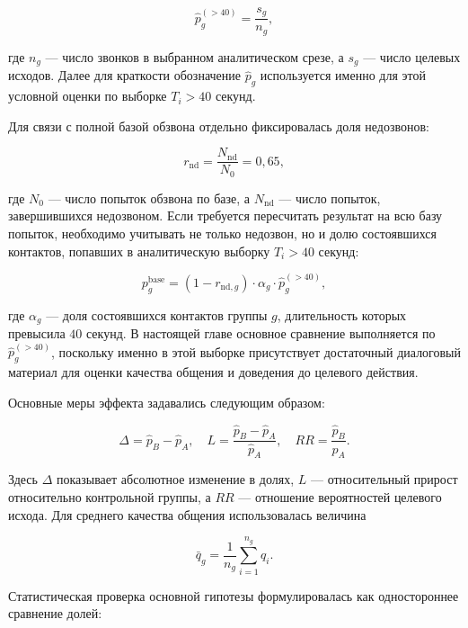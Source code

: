 \documentclass[a4paper,14pt]{extarticle}
\begin{document}
\begin{equation}
\hat p_g^{(>40)} = \frac{s_g}{n_g},
\end{equation}

где \(n_g\) --- число звонков в выбранном аналитическом срезе, а \(s_g\)
--- число целевых исходов. Далее для краткости обозначение \(\hat p_g\)
используется именно для этой условной оценки по выборке \(T_i > 40\)
секунд.

Для связи с полной базой обзвона отдельно фиксировалась доля недозвонов:

\begin{equation}
r_{\mathrm{nd}} = \frac{N_{\mathrm{nd}}}{N_0} = 0{,}65,
\end{equation}

где \(N_0\) --- число попыток обзвона по базе, а \(N_{\mathrm{nd}}\) ---
число попыток, завершившихся недозвоном. Если требуется пересчитать
результат на всю базу попыток, необходимо учитывать не только недозвон,
но и долю состоявшихся контактов, попавших в аналитическую выборку
\(T_i > 40\) секунд:

\begin{equation}
p_g^{\mathrm{base}} =
(1-r_{\mathrm{nd},g}) \cdot \alpha_g \cdot \hat p_g^{(>40)},
\end{equation}

где \(\alpha_g\) --- доля состоявшихся контактов группы \(g\),
длительность которых превысила \(40\) секунд. В настоящей главе основное
сравнение выполняется по \(\hat p_g^{(>40)}\), поскольку именно в этой
выборке присутствует достаточный диалоговый материал для оценки качества
общения и доведения до целевого действия.

Основные меры эффекта задавались следующим образом:

\begin{equation}
\Delta = \hat p_B - \hat p_A,
\quad
L = \frac{\hat p_B - \hat p_A}{\hat p_A},
\quad
RR = \frac{\hat p_B}{\hat p_A}.
\end{equation}

Здесь \(\Delta\) показывает абсолютное изменение в долях, \(L\) ---
относительный прирост относительно контрольной группы, а \(RR\) ---
отношение вероятностей целевого исхода. Для среднего качества общения
использовалась величина

\begin{equation}
\bar q_g = \frac{1}{n_g}\sum_{i=1}^{n_g} q_i.
\end{equation}

Статистическая проверка основной гипотезы формулировалась как
одностороннее сравнение долей:
\end{document}
